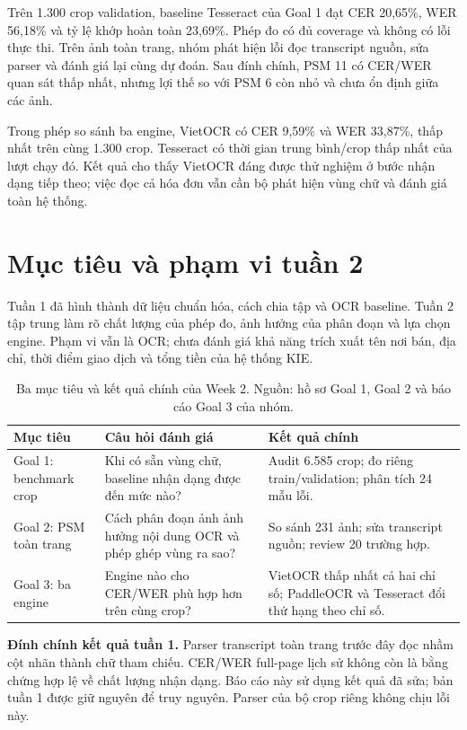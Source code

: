 \documentclass[11pt,a4paper]{article}
\newcommand{\note}[1]{\par\begingroup\setlength{\fboxsep}{9pt}\noindent\colorbox{pale}{\parbox{\dimexpr\linewidth-18pt\relax}{#1}}\endgroup\par}
\begin{document}
Trên 1.300 crop validation, baseline Tesseract của Goal 1 đạt CER 20,65\%, WER 56,18\% và tỷ lệ khớp hoàn toàn 23,69\%. Phép đo có đủ coverage và không có lỗi thực thi. Trên ảnh toàn trang, nhóm phát hiện lỗi đọc transcript nguồn, sửa parser và đánh giá lại cùng dự đoán. Sau đính chính, PSM 11 có CER/WER quan sát thấp nhất, nhưng lợi thế so với PSM 6 còn nhỏ và chưa ổn định giữa các ảnh.

Trong phép so sánh ba engine, VietOCR có CER 9,59\% và WER 33,87\%, thấp nhất trên cùng 1.300 crop. Tesseract có thời gian trung bình/crop thấp nhất của lượt chạy đó. Kết quả cho thấy VietOCR đáng được thử nghiệm ở bước nhận dạng tiếp theo; việc đọc cả hóa đơn vẫn cần bộ phát hiện vùng chữ và đánh giá toàn hệ thống.

\section{Mục tiêu và phạm vi tuần 2}
Tuần 1 đã hình thành dữ liệu chuẩn hóa, cách chia tập và OCR baseline. Tuần 2 tập trung làm rõ chất lượng của phép đo, ảnh hưởng của phân đoạn và lựa chọn engine. Phạm vi vẫn là OCR; chưa đánh giá khả năng trích xuất tên nơi bán, địa chỉ, thời điểm giao dịch và tổng tiền của hệ thống KIE.

\begin{table}[H]
\caption{Ba mục tiêu và kết quả chính của Week 2. Nguồn: hồ sơ Goal 1, Goal 2 và báo cáo Goal 3 của nhóm.}
\begin{tabularx}{\linewidth}{@{}P{27mm}YP{48mm}@{}}
\toprule
\textbf{Mục tiêu} & \textbf{Câu hỏi đánh giá} & \textbf{Kết quả chính}\\\midrule
Goal 1: benchmark crop & Khi có sẵn vùng chữ, baseline nhận dạng được đến mức nào? & Audit 6.585 crop; đo riêng train/validation; phân tích 24 mẫu lỗi.\\
Goal 2: PSM toàn trang & Cách phân đoạn ảnh ảnh hưởng nội dung OCR và phép ghép vùng ra sao? & So sánh 231 ảnh; sửa transcript nguồn; review 20 trường hợp.\\
Goal 3: ba engine & Engine nào cho CER/WER phù hợp hơn trên cùng crop? & VietOCR thấp nhất cả hai chỉ số; PaddleOCR và Tesseract đổi thứ hạng theo chỉ số.\\
\bottomrule
\end{tabularx}
\end{table}

\note{\textbf{Đính chính kết quả tuần 1.} Parser transcript toàn trang trước đây đọc nhầm cột nhãn thành chữ tham chiếu. CER/WER full-page lịch sử không còn là bằng chứng hợp lệ về chất lượng nhận dạng. Báo cáo này sử dụng kết quả đã sửa; bản tuần 1 được giữ nguyên để truy nguyên. Parser của bộ crop riêng không chịu lỗi này.}
\end{document}
